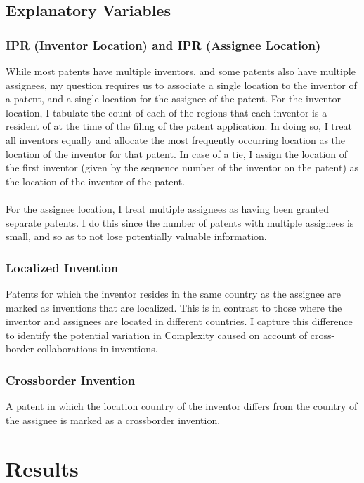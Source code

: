 \documentclass[12pt]{article}
\begin{document}
\subsection{Explanatory Variables}
\subsubsection{IPR (Inventor Location) and IPR (Assignee Location)}
While most patents have multiple inventors, and some patents also have multiple assignees, my question requires us to associate a single location to the inventor of a patent, and a single location for the assignee of the patent. For the inventor location, I tabulate the count of each of the regions that each inventor is a resident of at the time of the filing of the patent application. In doing so, I treat all inventors equally and allocate the most frequently occurring location as the location of the inventor for that patent. In case of a tie, I assign the location of the first inventor (given by the sequence number of the inventor on the patent) as the location of the inventor of the patent. 
\\\\
For the assignee location, I treat multiple assignees as having been granted separate patents. I do this since the number of patents with multiple assignees is small, and so as to not lose potentially valuable information.

\subsubsection{Localized Invention}
Patents for which the inventor resides in the same country as the assignee are marked as inventions that are localized. This is in contrast to those where the inventor and assignees are located in different countries. I capture this difference to identify the potential variation in Complexity caused on account of cross-border collaborations in inventions. 

\subsubsection{Crossborder Invention}
A patent in which the location country of the inventor differs from the country of the assignee is marked as a crossborder invention.

\section{Results}
\end{document}
